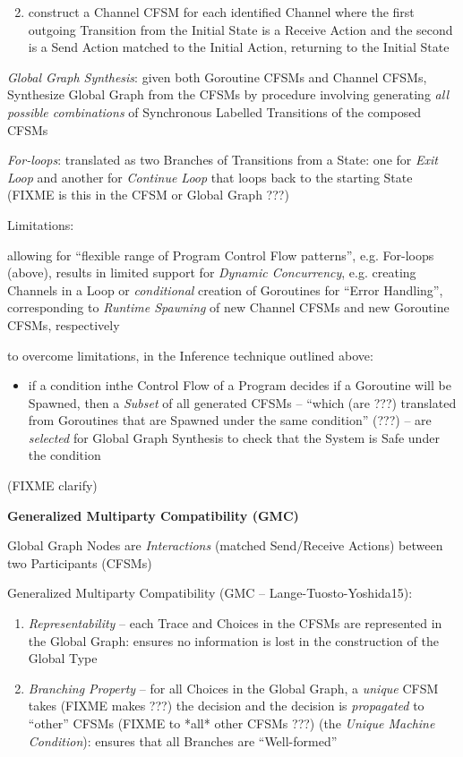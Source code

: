 \begin{enumerate}
  \setcounter{enumi}{1}
  \item construct a Channel CFSM for each identified Channel where the
    first outgoing Transition from the Initial State is a Receive
    Action and the second is a Send Action matched to the Initial
    Action, returning to the Initial State
\end{enumerate}

\emph{Global Graph Synthesis}: given both Goroutine CFSMs and Channel
CFSMs, Synthesize Global Graph from the CFSMs by procedure involving
generating \emph{all possible combinations} of Synchronous Labelled
Transitions of the composed CFSMs

\emph{For-loops}: translated as two Branches of Transitions from a
State: one for \emph{Exit Loop} and another for \emph{Continue Loop}
that loops back to the starting State
(FIXME is this in the CFSM or Global Graph ???)

Limitations:

allowing for ``flexible range of Program Control Flow patterns'', e.g.
For-loops (above), results in limited support for \emph{Dynamic
  Concurrency}, e.g. creating Channels in a Loop or \emph{conditional}
creation of Goroutines for ``Error Handling'', corresponding to
\emph{Runtime Spawning} of new Channel CFSMs and new Goroutine CFSMs,
respectively

to overcome limitations, in the Inference technique outlined above:
\begin{itemize}
\item if a condition inthe Control Flow of a Program decides if a
  Goroutine will be Spawned, then a \emph{Subset} of all generated
  CFSMs -- ``which (are ???) translated from Goroutines that are
  Spawned under the same condition'' (???) -- are \emph{selected} for
  Global Graph Synthesis to check that the System is Safe under the
  condition
\end{itemize}
(FIXME clarify)


\textbf{Generalized Multiparty Compatibility (GMC)}

Global Graph Nodes are \emph{Interactions} (matched Send/Receive
Actions) between two Participants (CFSMs)

Generalized Multiparty Compatibility (GMC -- Lange-Tuosto-Yoshida15):
\begin{enumerate}[label=(\roman*)]
  \item \emph{Representability} -- each Trace and Choices in the CFSMs
    are represented in the Global Graph: ensures no information is
    lost in the construction of the Global Type
  \item \emph{Branching Property} -- for all Choices in the Global
    Graph, a \emph{unique} CFSM takes (FIXME makes ???) the decision
    and the decision is \emph{propagated} to ``other'' CFSMs (FIXME to
    *all* other CFSMs ???) (the \emph{Unique Machine Condition}):
    ensures that all Branches are ``Well-formed''
\end{enumerate}

